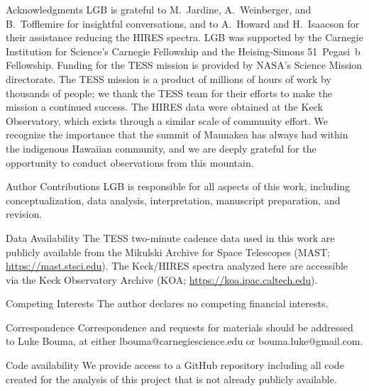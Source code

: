 \documentclass{nature3}
\begin{document}
\begin{addendum}

\item[Acknowledgments]
  LGB is grateful to M.~Jardine, A.~Weinberger, and B.~Tofflemire for
  insightful conversations, and to A.~Howard and H.~Isaacson for their
  assistance reducing the HIRES spectra.
  LGB was supported by the Carnegie Institution for Science's Carnegie
  Fellowship and the Heising-Simons 51~Pegasi~b Fellowship.
  Funding for the TESS mission is provided by NASA’s Science Mission
  directorate.
  The TESS mission is a product of millions of hours of work by
  thousands of people; we thank the TESS team for their efforts to
  make the mission a continued success.
  The HIRES data were obtained at the Keck Observatory, which exists
  through a similar scale of community effort.
  We recognize the importance that the summit of Maunakea has always had
  within the indigenous Hawaiian community, and we are deeply grateful 
  for the opportunity to conduct observations from this mountain.

\item[Author Contributions] LGB is responsible for all aspects of this
  work, including conceptualization, data analysis, interpretation,
  manuscript preparation, and revision.

\item[Data Availability] The TESS two-minute cadence data used in this
  work are publicly available from the Mikulski Archive for Space
  Telescopes (MAST; \url{https://mast.stsci.edu}). The Keck/HIRES
  spectra analyzed here are accessible via the Keck Observatory
  Archive (KOA; \url{https://koa.ipac.caltech.edu}).

\item[Competing Interests] The author declares no competing financial
  interests.
 
\item[Correspondence] Correspondence and requests for materials should
  be addressed to Luke Bouma, at either lbouma@carnegiescience.edu or
  bouma.luke@gmail.com.
 
\item[Code availability] We provide access to a GitHub repository
  including all code created for the analysis of this project that is
  not already publicly available.

\end{addendum}
\end{document}
